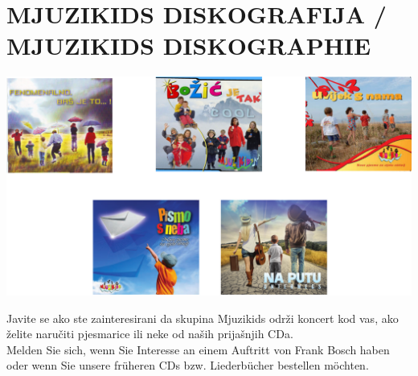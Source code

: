 \documentclass[a4paper,twoside, svgnames]{article}
\begin{document}
\section*{MJUZIKIDS DISKOGRAFIJA / MJUZIKIDS DISKOGRAPHIE}

\begin{center}
\vspace{1cm}
\includegraphics[width=\linewidth]{images/cd}

\vspace{1cm}
Javite se ako ste zainteresirani da skupina Mjuzikids održi koncert kod vas,
ako želite naručiti pjesmarice ili neke od naših prijašnjih CDa.\\
\vspace{1cm}
Melden Sie sich, wenn Sie Interesse an einem Auftritt von Frank Bosch haben oder
wenn Sie unsere früheren CDs bzw. Liederbücher bestellen möchten.
\vfill

\end{center}

\newpage
\end{document}
